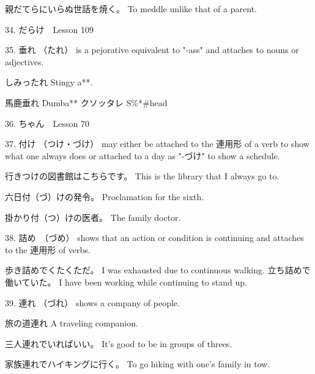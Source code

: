 \par{親だてらにいらぬ世話を焼く。 \hfill\break
To meddle unlike that of a parent. }

\par{34. だらけ　\textrightarrow  Lesson 109  }

\par{35. 垂れ （たれ） is a pejorative equivalent to "-ass" and attaches to nouns or adjectives. }

\par{しみったれ \hfill\break
Stingy a**. }

\par{馬鹿垂れ \hfill\break
Dumba** \hfill\break
\hfill\break
クソッタレ \hfill\break
S\%*\#head }

\par{36. ちゃん　\textrightarrow  Lesson 70  \hfill\break
}

\par{37. 付け （つけ・づけ） may either be attached to the 連用形 of a verb  to show what one always does or attached to a day as "-づけ" to show a schedule. }

\par{行きつけの図書館はこちらです。 \hfill\break
This is the library that I always go to. }

\par{六日付（づ）けの発令。 \hfill\break
Proclamation for the sixth. }

\par{掛かり付（つ）けの医者。 \hfill\break
The family doctor. }

\par{38. 詰め　（づめ） shows that an action or condition is continuing and attaches to the 連用形 of verbs. }

\par{歩き詰めでくたくただ。 \hfill\break
I was exhausted due to continuous walking. \hfill\break
\hfill\break
立ち詰めで働いていた。 \hfill\break
I have been working while continuing to stand up. }

\par{39. 連れ （づれ） shows a company of people. }

\par{旅の道連れ \hfill\break
A traveling companion. }

\par{三人連れでいればいい。 \hfill\break
It's good to be in groups of threes. }

\par{家族連れでハイキングに行く。 \hfill\break
To go hiking with one's family in tow. }


